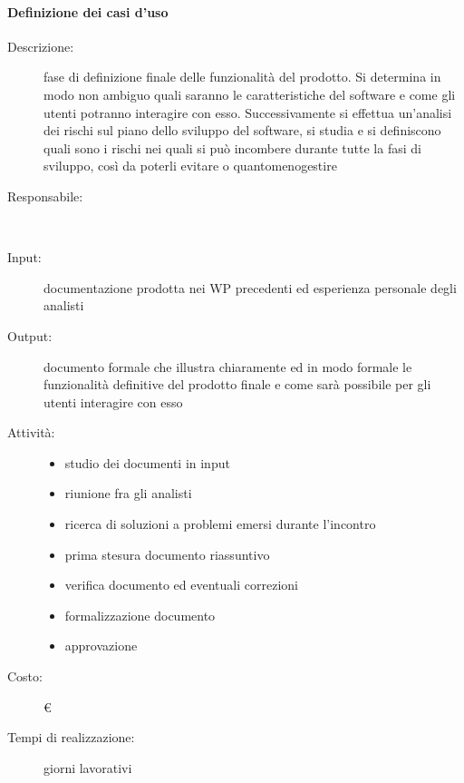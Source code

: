 \paragraph{Definizione dei casi d'uso}
\begin{description}
\item[Descrizione:]fase di definizione finale delle funzionalità del prodotto. Si determina
in modo non ambiguo quali saranno le caratteristiche del software e come gli utenti
potranno interagire con esso. Successivamente si effettua un’analisi dei rischi sul piano dello sviluppo
del software, si studia e si definiscono quali sono i rischi nei quali si
può incombere durante tutte la fasi di sviluppo, così da poterli evitare o quantomenogestire\\

\item[Responsabile:] \\

\item[Input: ]documentazione prodotta nei WP precedenti ed esperienza personale degli
analisti\\

\item[Output:] documento formale che illustra chiaramente ed in modo formale le funzionalità
definitive del prodotto finale e come sarà possibile per gli utenti interagire con esso\\

\item[Attività:]
\begin{itemize}
\item studio dei documenti in input
\item riunione fra gli analisti
\item ricerca di soluzioni a problemi emersi durante l’incontro
\item prima stesura documento riassuntivo
\item verifica documento ed eventuali correzioni
\item formalizzazione documento
\item approvazione
\end{itemize}

\item[Costo:] \euro \\
\item[Tempi di realizzazione:]  giorni lavorativi
\end{description}




